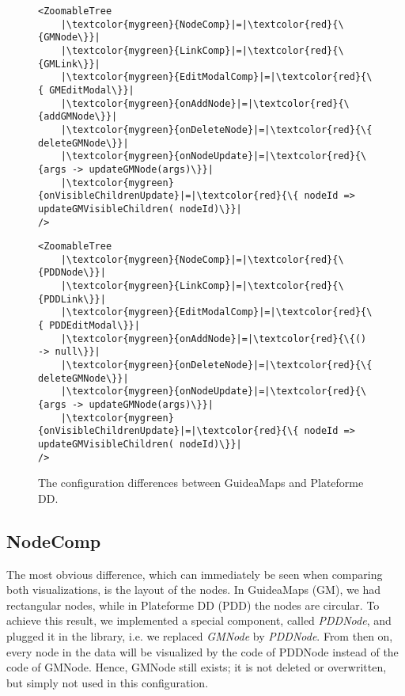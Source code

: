 \begin{figure}[H]
	\begin{minipage}{0.5\textwidth}
 		 \centering
		 \begin{verbatim}
<ZoomableTree
    |\textcolor{mygreen}{NodeComp}|=|\textcolor{red}{\{GMNode\}}|
    |\textcolor{mygreen}{LinkComp}|=|\textcolor{red}{\{GMLink\}}|
    |\textcolor{mygreen}{EditModalComp}|=|\textcolor{red}{\{ GMEditModal\}}|
    |\textcolor{mygreen}{onAddNode}|=|\textcolor{red}{\{addGMNode\}}|
    |\textcolor{mygreen}{onDeleteNode}|=|\textcolor{red}{\{ deleteGMNode\}}|
    |\textcolor{mygreen}{onNodeUpdate}|=|\textcolor{red}{\{args -> updateGMNode(args)\}}|
    |\textcolor{mygreen}{onVisibleChildrenUpdate}|=|\textcolor{red}{\{ nodeId => updateGMVisibleChildren( nodeId)\}}|
/>
		\end{verbatim}
		\label{lst:default-components}
	\end{minipage}
 	\begin{minipage}{0.5\textwidth}
  		\centering
  		\begin{verbatim}
<ZoomableTree
    |\textcolor{mygreen}{NodeComp}|=|\textcolor{red}{\{PDDNode\}}|
    |\textcolor{mygreen}{LinkComp}|=|\textcolor{red}{\{PDDLink\}}|
    |\textcolor{mygreen}{EditModalComp}|=|\textcolor{red}{\{ PDDEditModal\}}|
    |\textcolor{mygreen}{onAddNode}|=|\textcolor{red}{\{() -> null\}}|
    |\textcolor{mygreen}{onDeleteNode}|=|\textcolor{red}{\{ deleteGMNode\}}|
    |\textcolor{mygreen}{onNodeUpdate}|=|\textcolor{red}{\{args -> updateGMNode(args)\}}|
    |\textcolor{mygreen}{onVisibleChildrenUpdate}|=|\textcolor{red}{\{ nodeId => updateGMVisibleChildren( nodeId)\}}|
/>
		\end{verbatim}
		\label{lst:custom-components}
 	\end{minipage}
	\caption{The configuration differences between GuideaMaps and Plateforme DD.}
	\label{fig:differences-gm-vs-pdd}
\end{figure}

\subsection{NodeComp}\label{sec:usecase-nodecomp}
The most obvious difference, which can immediately be seen when comparing both visualizations, is the layout of the nodes. In GuideaMaps (GM), we had rectangular nodes, while in Plateforme DD (PDD) the nodes are circular. To achieve this result, we implemented a special component, called \textit{PDDNode}, and plugged it in the library, i.e. we replaced \textit{GMNode} by \textit{PDDNode}. From then on, every node in the data will be visualized by the code of PDDNode instead of the code of GMNode. Hence, GMNode still exists; it is not deleted or overwritten, but simply not used in this configuration.



